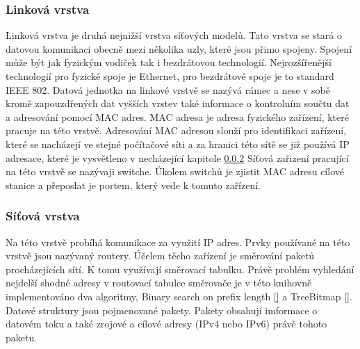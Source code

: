 \subsubsection{Linková vrstva}\label{layers:link}
Linková vrstva je druhá nejnižší vrstva síťových modelů. Tato vrstva se stará o datovou komunikaci
obecně mezi několika uzly, které jsou přimo spojeny. Spojení může být jak fyzickým vodiček tak i
bezdrátovou technologií. Nejrozšířenější technologií pro fyzické spoje je Ethernet, pro bezdrátové spoje
je to standard IEEE 802. Datová jednotka na linkové vrstvě se nazývá rámec a nese v sobě kromě
zapouzdřených dat vyšších vrstev také informace o kontrolním součtu dat a adresování pomocí MAC adres.
MAC adresa je adresa fyzického zařízení, které pracuje na této vrstvě.
Adresování MAC adresou slouží pro identifikaci zařízení, které se nacházejí ve stejné počítačové síti
a za hranici této sítě se již používá IP adresace, které je vysvětleno v necházející kapitole \ref{layers:network}
Síťová zařizení pracující na této vrstvě se nazývaji switche. Úkolem switchů je zjistit MAC adresu cílové stanice a přeposlat je portem, který vede k tomuto zařízení.

\subsubsection{Síťová vrstva}\label{layers:network}
Na této vrstvě probíhá komunikace za využití IP adres. Prvky používané na této vrstvě jsou nazývaný routery.
Účelem těcho zařízení je směrování paketů procházejících sítí. K tomu využívají směrovací tabulku.
Právě problém vyhledání nejdelší shodné adresy v routovací tabulce směrovače je v této knihovně implementováno
dva algoritmy, Binary search on prefix length \ref{} a TreeBitmap \ref{}.
Datové struktury jsou pojmenované pakety. Pakety obsahují imformace o datovém toku a také zrojové a cílové adresy (IPv4 nebo IPv6) právě tohoto paketu.

